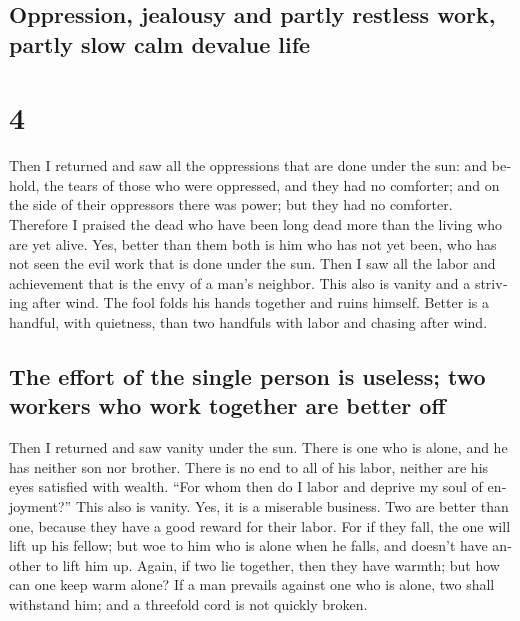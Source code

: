 \begin{paracol}{2}
\switchcolumn
\begin{otherlanguage}{english}

\hypertarget{oppression-jealousy-and-partly-restless-work-partly-slow-calm-devalue-life}{%
\subsection{Oppression, jealousy and partly restless work, partly slow
calm devalue
life}\label{oppression-jealousy-and-partly-restless-work-partly-slow-calm-devalue-life}}

\hypertarget{section-7}{%
\section{4}\label{section-7}}

 Then I returned and saw all the oppressions that are done
under the sun: and behold, the tears of those who were oppressed, and
they had no comforter; and on the side of their oppressors there was
power; but they had no comforter.  Therefore I praised the
dead who have been long dead more than the living who are yet alive.
 Yes, better than them both is him who has not yet been,
who has not seen the evil work that is done under the sun.
 Then I saw all the labor and achievement that is the envy
of a man's neighbor. This also is vanity and a striving after wind.
 The fool folds his hands together and ruins himself.
 Better is a handful, with quietness, than two handfuls
with labor and chasing after wind.

\hypertarget{the-effort-of-the-single-person-is-useless-two-workers-who-work-together-are-better-off}{%
\subsection{The effort of the single person is useless; two workers who
work together are better
off}\label{the-effort-of-the-single-person-is-useless-two-workers-who-work-together-are-better-off}}

 Then I returned and saw vanity under the sun.
 There is one who is alone, and he has neither son nor
brother. There is no end to all of his labor, neither are his eyes
satisfied with wealth. ``For whom then do I labor and deprive my soul of
enjoyment?'' This also is vanity. Yes, it is a miserable business.
 Two are better than one, because they have a good reward
for their labor.  For if they fall, the one will lift up
his fellow; but woe to him who is alone when he falls, and doesn't have
another to lift him up.  Again, if two lie together, then
they have warmth; but how can one keep warm alone?  If a
man prevails against one who is alone, two shall withstand him; and a
threefold cord is not quickly broken.


\end{otherlanguage}
\end{paracol}
